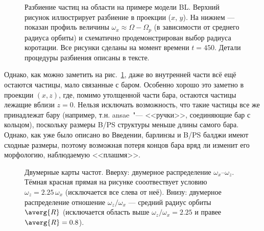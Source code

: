 \documentclass[tikz]{trlnotes}
\begin{document}
\begin{figure}[htpb]
  \centering
  \par
  \caption{Разбиение частиц на области на примере модели BL. Верхний рисунок иллюстрирует разбиение в проекции ($x$, $y$). На нижнем --- показан профиль величины $ω_x \approx Ω - Ω_p$ (в зависимости от среднего радиуса орбиты) и схематично продемонстрирован выбор радиуса коротации. Все рисунки сделаны на момент времени $t=450$.
Детали процедуры разбиения описаны в тексте.}%
  \label{fig:disksplit}
\end{figure}

Однако, как можно заметить на рис.~\ref{fig:disksplit}, даже во внутренней части всё ещё остаются частицы, мало
связанные с баром. Особенно хорошо это заметно в проекции $(x, z)$, где, помимо утолщенной части бара, остаются
частицы лежащие вблизи $z=0$. Нельзя исключать возможность, что такие частицы все же принадлежат бару (например, т.н.
ansae~"--- <<ручки>>, соединяющие бар с кольцом), поскольку размеры B/PS структуры меньше длины самого бара. Однако, как
уже было описано во Введении, барлинзы и B/PS балджи имеют сходные размеры, поэтому возможная потеря концов бара
вряд ли изменит его морфологию, наблюдаемую <<плашмя>>. 

\begin{figure}[htpb]
  \centering
  \caption{Двумерные карты частот. Вверху: двумерное распределение $ω_x$--$ω_z$. Тёмная красная прямая на рисунке сооотвествует условию $ω_z = 2.25\, ω_x$ (исключается все слева от неё). Внизу: двумерное распределение отношение $ω_z/ω_x$ --- средний радиус
  орбиты $\averg{R}$ (исключается область выше $ω_z/ω_x = 2.25$ и правее $\averg{R} = 0.8$).}
  \label{fig:innerrefine}
\end{figure}
\end{document}
